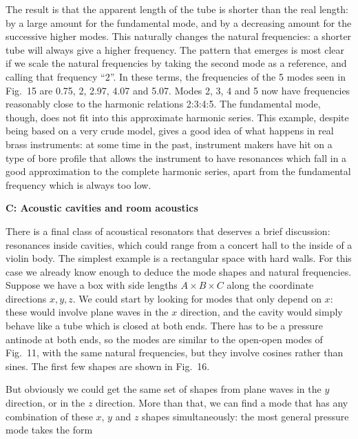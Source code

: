   The result is that the apparent length of the tube is shorter than the real 
  length: by a large amount for the fundamental mode, and by a decreasing 
  amount for the successive higher modes. This naturally changes the natural 
  frequencies: a shorter tube will always give a higher frequency. The pattern 
  that emerges is most clear if we scale the natural frequencies by taking the 
  second mode as a reference, and calling that frequency ``2''. In these terms, 
  the frequencies of the 5 modes seen in Fig.\ 15 are 0.75, 2, 2.97, 4.07 and 
  5.07. Modes 2, 3, 4 and 5 now have frequencies reasonably close to the 
  harmonic relations 2:3:4:5. The fundamental mode, though, does not fit into 
  this approximate harmonic series. This example, despite being based on a very 
  crude model, gives a good idea of what happens in real brass instruments: at 
  some time in the past, instrument makers have hit on a type of bore profile 
  that allows the instrument to have resonances which fall in a good 
  approximation to the complete harmonic series, apart from the fundamental 
  frequency which is always too low. 

  \textbf{C: Acoustic cavities and room acoustics} 

  There is a final class of acoustical resonators that deserves a brief 
  discussion: resonances inside cavities, which could range from a concert hall 
  to the inside of a violin body. The simplest example is a rectangular space 
  with hard walls. For this case we already know enough to deduce the mode 
  shapes and natural frequencies. Suppose we have a box with side lengths $A 
  \times B \times C$ along the coordinate directions $x,y,z$. We could start by 
  looking for modes that only depend on $x$: these would involve plane waves in 
  the $x$ direction, and the cavity would simply behave like a tube which is 
  closed at both ends. There has to be a pressure antinode at both ends, so the 
  modes are similar to the open-open modes of Fig.\ 11, with the same natural 
  frequencies, but they involve cosines rather than sines. The first few shapes 
  are shown in Fig.\ 16. 


  But obviously we could get the same set of shapes from plane waves in the $y$ 
  direction, or in the $z$ direction. More than that, we can find a mode that 
  has any combination of these $x$, $y$ and $z$ shapes simultaneously: the most 
  general pressure mode takes the form 

